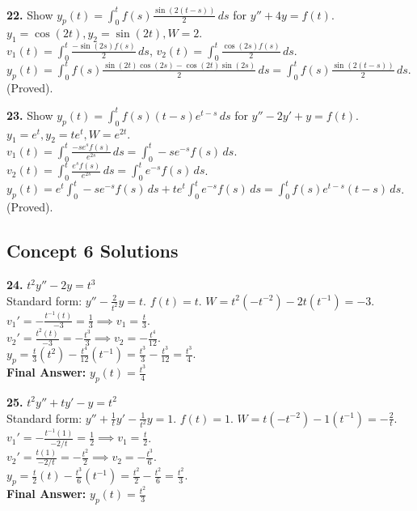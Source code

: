 \documentclass[11pt]{article}
\begin{document}
\vspace{0.5cm}
\textbf{22.} Show $y_p(t) = \int_0^t f(s) \frac{\sin(2(t-s))}{2} \, ds$ for $y'' + 4y = f(t)$. \\
$y_1 = \cos(2t), y_2 = \sin(2t), W = 2$. \\
$v_1(t) = \int_0^t \frac{-\sin(2s)f(s)}{2} \, ds$, $v_2(t) = \int_0^t \frac{\cos(2s)f(s)}{2} \, ds$. \\
$y_p(t) = \int_0^t f(s) \frac{\sin(2t)\cos(2s) - \cos(2t)\sin(2s)}{2} \, ds = \int_0^t f(s) \frac{\sin(2(t-s))}{2} \, ds$. (Proved).

\vspace{0.5cm}
\textbf{23.} Show $y_p(t) = \int_0^t f(s) (t-s)e^{t-s} \, ds$ for $y'' - 2y' + y = f(t)$. \\
$y_1 = e^t, y_2 = te^t, W = e^{2t}$. \\
$v_1(t) = \int_0^t \frac{-se^s f(s)}{e^{2s}} \, ds = \int_0^t -se^{-s}f(s) \, ds$. \\
$v_2(t) = \int_0^t \frac{e^s f(s)}{e^{2s}} \, ds = \int_0^t e^{-s}f(s) \, ds$. \\
$y_p(t) = e^t \int_0^t -se^{-s}f(s) \, ds + te^t \int_0^t e^{-s}f(s) \, ds = \int_0^t f(s) e^{t-s}(t-s) \, ds$. (Proved).

\subsection*{Concept 6 Solutions}
\textbf{24.} $t^2 y'' - 2y = t^3$ \\
Standard form: $y'' - \frac{2}{t^2}y = t$. $f(t) = t$. $W = t^2(-t^{-2}) - 2t(t^{-1}) = -3$. \\
$v_1' = -\frac{t^{-1}(t)}{-3} = \frac{1}{3} \implies v_1 = \frac{t}{3}$. \\
$v_2' = \frac{t^2(t)}{-3} = -\frac{t^3}{3} \implies v_2 = -\frac{t^4}{12}$. \\
$y_p = \frac{t}{3}(t^2) - \frac{t^4}{12}(t^{-1}) = \frac{t^3}{3} - \frac{t^3}{12} = \frac{t^3}{4}$. \\
\textbf{Final Answer:} $y_p(t) = \frac{t^3}{4}$

\vspace{0.5cm}
\textbf{25.} $t^2 y'' + t y' - y = t^2$ \\
Standard form: $y'' + \frac{1}{t}y' - \frac{1}{t^2}y = 1$. $f(t) = 1$. $W = t(-t^{-2}) - 1(t^{-1}) = -\frac{2}{t}$. \\
$v_1' = -\frac{t^{-1}(1)}{-2/t} = \frac{1}{2} \implies v_1 = \frac{t}{2}$. \\
$v_2' = \frac{t(1)}{-2/t} = -\frac{t^2}{2} \implies v_2 = -\frac{t^3}{6}$. \\
$y_p = \frac{t}{2}(t) - \frac{t^3}{6}(t^{-1}) = \frac{t^2}{2} - \frac{t^2}{6} = \frac{t^2}{3}$. \\
\textbf{Final Answer:} $y_p(t) = \frac{t^2}{3}$
\end{document}
